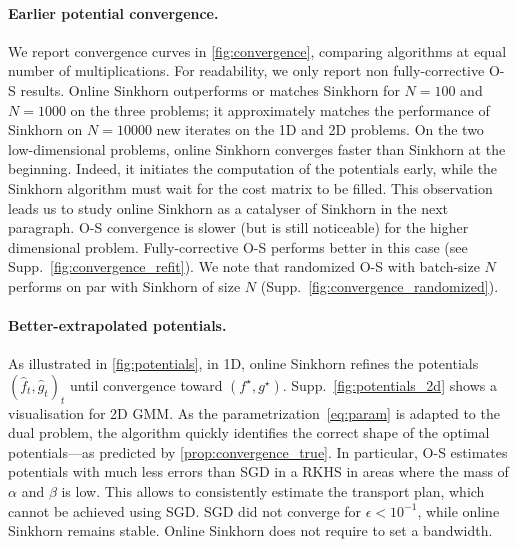\paragraph{Earlier potential convergence.} 
We report convergence curves in \autoref{fig:convergence}, comparing algorithms
at equal number of multiplications. For readability, we only report non
fully-corrective O-S results. Online Sinkhorn outperforms or matches Sinkhorn for $N=100$
and $N=1000$ on the three problems; it approximately matches the performance of
Sinkhorn on $N=10000$ new iterates on the 1D and 2D problems. On the two
low-dimensional problems, online Sinkhorn converges faster than Sinkhorn at the
beginning. Indeed, it initiates the computation of the potentials early, while the Sinkhorn
algorithm must wait for the cost matrix to be filled. This observation leads us
to study online Sinkhorn as a catalyser of Sinkhorn in the next paragraph. O-S
convergence is slower (but is still noticeable) for the higher dimensional problem.
Fully-corrective O-S performs better in this case (see Supp.~\autoref{fig:convergence_refit}). We note that
randomized O-S with batch-size $N$ performs on par with Sinkhorn of size $N$ (Supp.~\autoref{fig:convergence_randomized}).

\paragraph{Better-extrapolated potentials.} As illustrated in
\autoref{fig:potentials}, in 1D, online Sinkhorn refines the potentials $(\hat f_t, \hat g_t)_t$
until convergence toward $(f^\star, g^\star)$. Supp.~\autoref{fig:potentials_2d} shows a visualisation for 2D GMM. As the parametrization~\eqref{eq:param} is 
adapted to the dual problem, the algorithm quickly identifies the correct shape of
the optimal potentials---as predicted by \autoref{prop:convergence_true}. In
particular, O-S estimates potentials with much less errors than SGD in a RKHS in
areas where the mass of $\alpha$ and $\beta$ is low. This allows to consistently estimate the transport plan, which cannot be achieved using SGD. SGD did not converge for $\epsilon < 10^{-1}$, while online Sinkhorn remains stable. Online
Sinkhorn does not require to set a bandwidth.


